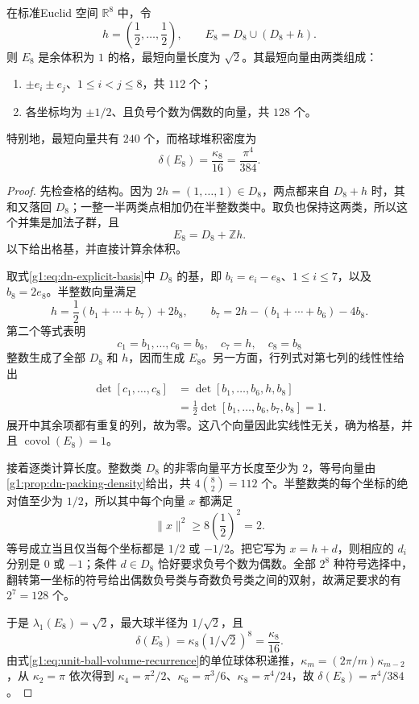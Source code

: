 \begin{proposition}
	\label{g1:prop:e8-packing-density}
	在标准Euclid 空间 \(\mathbb R^8\) 中，令
	\begin{equation}
		\label{g1:eq:e8-two-cosets}
		h=\left(\frac12,\ldots,\frac12\right),\qquad
		E_8=D_8\cup(D_8+h).
	\end{equation}
	则 \(E_8\) 是余体积为 \(1\) 的格，最短向量长度为 \(\sqrt2\)。其最短向量由两类组成：
	\begin{enumerate}
		\item \(\pm e_i\pm e_j\)、\(1\le i<j\le8\)，共 \(112\) 个；
		\item 各坐标均为 \(\pm1/2\)、且负号个数为偶数的向量，共 \(128\) 个。
	\end{enumerate}
	特别地，最短向量共有 \(240\) 个，而格球堆积密度为
	\[
		\delta(E_8)=\frac{\kappa_8}{16}=\frac{\pi^4}{384}.
	\]
\end{proposition}
\begin{proof}
	先检查格的结构。因为 \(2h=(1,\ldots,1)\in D_8\)，两点都来自 \(D_8+h\) 时，其和又落回 \(D_8\)；一整一半两类点相加仍在半整数类中。取负也保持这两类，所以这个并集是加法子群，且
	\[
		E_8=D_8+\mathbb Zh.
	\]
	以下给出格基，并直接计算余体积。

	取式\eqref{g1:eq:dn-explicit-basis}中 \(D_8\) 的基，即 \(b_i=e_i-e_8\)、\(1\le i\le7\)，以及 \(b_8=2e_8\)。半整数向量满足
	\[
		h=\frac12(b_1+\cdots+b_7)+2b_8,
		\qquad
		b_7=2h-(b_1+\cdots+b_6)-4b_8.
	\]
	第二个等式表明
	\[
		c_1=b_1,\ldots,c_6=b_6,\quad c_7=h,\quad c_8=b_8
	\]
	整数生成了全部 \(D_8\) 和 \(h\)，因而生成 \(E_8\)。另一方面，行列式对第七列的线性性给出
	\begin{align*}
		\det[c_1,\ldots,c_8]
		&=\det[b_1,\ldots,b_6,h,b_8]\\
		&=\frac12\det[b_1,\ldots,b_6,b_7,b_8]
		=1.
	\end{align*}
	展开中其余项都有重复的列，故为零。这八个向量因此实线性无关，确为格基，并且 \(\operatorname{covol}(E_8)=1\)。

	接着逐类计算长度。整数类 \(D_8\) 的非零向量平方长度至少为 \(2\)，等号向量由\cref{g1:prop:dn-packing-density}给出，共 \(4\binom82=112\) 个。半整数类的每个坐标的绝对值至少为 \(1/2\)，所以其中每个向量 \(x\) 都满足
	\[
		\lVert x\rVert^2\ge8\left(\frac12\right)^2=2.
	\]
	等号成立当且仅当每个坐标都是 \(1/2\) 或 \(-1/2\)。把它写为 \(x=h+d\)，则相应的 \(d_i\) 分别是 \(0\) 或 \(-1\)；条件 \(d\in D_8\) 恰好要求负号个数为偶数。全部 \(2^8\) 种符号选择中，翻转第一坐标的符号给出偶数负号类与奇数负号类之间的双射，故满足要求的有 \(2^7=128\) 个。

	于是 \(\lambda_1(E_8)=\sqrt2\)，最大球半径为 \(1/\sqrt2\)，且
	\[
		\delta(E_8)=\kappa_8(1/\sqrt2)^8=\frac{\kappa_8}{16}.
	\]
	由式\eqref{g1:eq:unit-ball-volume-recurrence}的单位球体积递推，\(\kappa_m=(2\pi/m)\kappa_{m-2}\)，从 \(\kappa_2=\pi\) 依次得到 \(\kappa_4=\pi^2/2\)、\(\kappa_6=\pi^3/6\)、\(\kappa_8=\pi^4/24\)，故 \(\delta(E_8)=\pi^4/384\)。
\end{proof}

